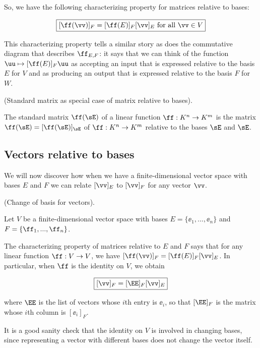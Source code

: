 \begin{deriv}
    So, we have the following characterizing property for matrices relative to bases:
    
    \begin{align*}
        \boxed
        {
            [\ff(\vv)]_F = [\ff(E)]_F [\vv]_E \text{ for all $\vv \in V$}
        }
    \end{align*}
    
    This characterizing property tells a similar story as does the commutative diagram that describes $\ff_{E,F}$: it says that we can think of the function $\uu \mapsto [\ff(E)]_F \uu$ as accepting an input that is expressed relative to the basis $E$ for $V$ and as producing an output that is expressed relative to the basis $F$ for $W$.
\end{deriv}

\begin{remark}
\label{ch::lin_alg::rmk::standard_matrix_as_matrix_wrt_bases}
    (Standard matrix as special case of matrix relative to bases). 
    
    The standard matrix $\ff(\sE)$ of a linear function $\ff:K^n \rightarrow K^m$ is the matrix $\ff(\sE) = [\ff(\sE)]_\sE$ of $\ff:K^n \rightarrow K^m$ relative to the bases $\sE$ and $\sE$.
\end{remark}

\newpage

\subsection*{Vectors relative to bases}

We will now discover how when we have a finite-dimensional vector space with bases $E$ and $F$ we can relate $[\vv]_E$ to $[\vv]_F$ for any vector $\vv$.

\begin{theorem}
    \label{ch::lin_alg::thm::change_of_basis_for_vectors}
    
    (Change of basis for vectors).
    
    Let $V$ be a finite-dimensional vector space with bases $E = \{\ee_1, ..., \ee_n\}$ and $F = \{\ff_1, ..., \ff_n\}$. 
    
    The characterizing property of matrices relative to $E$ and $F$ says that for any linear function $\ff:V \rightarrow V$, we have $[\ff(\vv)]_F = [\ff(E)]_F [\vv]_E$. In particular, when $\ff$ is the identity on $V$, we obtain
    
    \begin{align*}
        \boxed
        {
            [\vv]_F = [\EE]_F [\vv]_E
        }
    \end{align*}
    
    where $\EE$ is the list of vectors whose $i$th entry is $\ee_i$, so that $[\EE]_F$ is the matrix whose $i$th column is $[\ee_i]_F$.
    
    It is a good sanity check that the identity on $V$ is involved in changing bases, since representing a vector with different bases does not change the vector itself.
\end{theorem}

